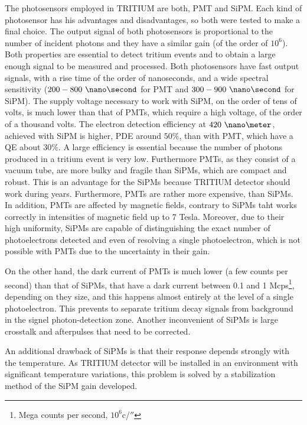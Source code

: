 The photosensors employed in TRITIUM are both, PMT and SiPM. Each kind of photosensor has his advantages and disadvantages, so both were tested to make a final choice. The output signal of both photosensors is proportional to the number of incident photons and they have a similar gain (of the order of $10^6$). Both properties are essential to detect tritium events and to obtain a large enough signal to be measured and processed. Both photosensors have fast output signals, with a rise time of the order of nanoseconds, and a wide spectral sensitivity ($200-800~\nano\second$ for PMT and $300-900~\nano\second$ for SiPM). The supply voltage necessary to work with SiPM, on the order of tens of volts, is much lower than that of PMTs, which require a high voltage, of the order of a thousand volts. The electron detection efficiency at $420~\nano\meter$,  achieved with SiPM is higher, PDE around $50\%$, than with PMT, which have a QE about $30\%$. A large efficiency is essential because the number of photons produced in a tritium event is very low. Furthermore PMTs, as they consist of a vacuum tube, are more bulky and fragile than SiPMs, which are compact and robust. This is an advantage for the SiPMs because TRITIUM detector should work during years. Furthermore, PMTs are rather more expensive, than SiPMs. In addition, PMTs are affected by magnetic fields, contrary to SiPMs taht works correctly in intensities  of magnetic field up to 7 Tesla. Moreover, due to their high uniformity, SiPMs are capable of distinguishing the exact number of photoelectrons detected and even of resolving a single photoelectron, which is not possible with PMTs due to the uncertainty in their gain.

On the other hand, the dark current of PMTs is much lower (a few counts per second) than that of SiPMs, that have a dark current between 0.1 and 1 Mcps\footnote{Mega counts per second, $10^6$c/$\second$}, depending on they size, and this happens almost entirely at the level of a single photoelectron. This prevents to separate tritium decay signals from background in the signel photon-detection zone. Another inconvenient of SiPMs is large crosstalk and afterpulses that need to be corrected.

An additional drawback of SiPMs is that their response depends strongly with the temperature. As TRITIUM detector will be installed in an environment with significant temperature variations, this problem is solved by a stabilization method of the SiPM gain developed.